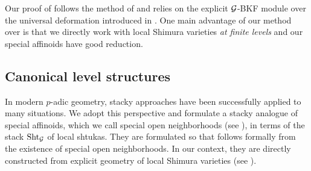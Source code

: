 \documentclass[12pt,reqno]{amsart}
\begin{document}
Our proof of  follows the method of \cite{Tak25z} and relies on the explicit ${\mathcal{G}}$-BKF module over the universal deformation introduced in \cite{Ito25a}. One main advantage of our method over \cite{BW16} is that we directly work with local Shimura varieties \textit{at finite levels} and our special affinoids have good reduction. 

\subsection{Canonical level structures}

In modern $p$-adic geometry, stacky approaches have been successfully applied to many situations. We adopt this perspective and formulate a stacky analogue of special affinoids, which we call special open neighborhoods (see ), in terms of the stack ${\operatorname{Sht}}_{{\mathcal{G}}}$ of local shtukas. They are formulated so that  follows formally from the existence of special open neighborhoods. In our context, they are directly constructed from explicit geometry of local Shimura varieties (see ). 
\end{document}
